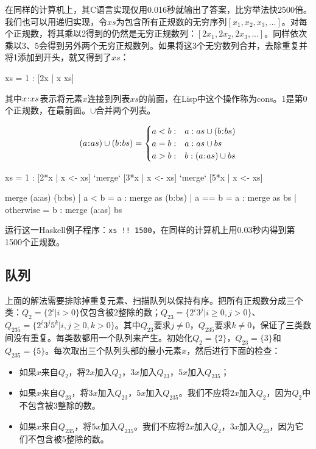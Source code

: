 \documentclass[b5paper, punct=kaiming]{ctexart}
\begin{document}
在同样的计算机上，其C语言实现仅用0.016秒就输出了答案，比穷举法快2500倍。我们也可以用递归实现，令$xs$为包含所有正规数的无穷序列$[x_1, x_2, x_3, ...]$。对每个正规数，将其乘以2得到的仍然是无穷正规数列：$[2x_1, 2x_2, 2x_3, ...]$。同样依次乘以3、5会得到另外两个无穷正规数列。如果将这3个无穷数列合并，去除重复并将1添加到开头，就又得到了$xs$：

\be
  xs = 1 : [2x | x \gets xs] \cup [3x | x \gets xs] \cup [5x | x \gets xs]
\ee

其中$x \mathbin{\!:\!} xs$表示将元素$x$连接到列表$xs$的前面，在Lisp中这个操作称为cons。1是第0个正规数，在最前面。$\cup$合并两个列表。

\[
(a \cons as) \cup (b \cons bs) = \begin{cases}
  a < b: & a : as \cup (b \cons bs) \\
  a = b: & a : as \cup bs \\
  a > b: & b : (a \cons as) \cup bs \\
\end{cases}
\]

\begin{Haskell}
xs = 1 : [2*x | x <- xs] `merge` [3*x | x <- xs] `merge` [5*x | x <- xs]

merge (a:as) (b:bs) | a < b = a : merge as (b:bs)
                    | a == b = a : merge as bs
                    | otherwise = b : merge (a:as) bs
\end{Haskell}

运行这一Haskell例子程序：\texttt{xs !! 1500}，在同样的计算机上用0.03秒内得到第1500个正规数。

\subsection*{队列}
上面的解法需要排除掉重复元素、扫描队列以保持有序。把所有正规数分成三个类：$Q_2 = \{2^i | i > 0\}$仅包含被2整除的数；$Q_{23} = \{ 2^i3^j | i \geq 0, j > 0 \}$、$Q_{235} = \{ 2^i3^j5^k | i,j \geq 0, k > 0\}$。其中$Q_{23}$要求$j \neq 0$，$Q_{235}$要求$k \neq 0$，保证了三类数间没有重复。每类数都用一个队列来产生。初始化$Q_2=\{ 2 \}$，$Q_{23} = \{ 3 \}$和$Q_{235} = \{ 5 \}$。每次取出三个队列头部的最小元素$x$，然后进行下面的检查：

\begin{itemize}
\item 如果$x$来自$Q_2$，将$2x$加入$Q_2$，$3x$加入$Q_{23}$，$5x$加入$Q_{235}$；
\item 如果$x$来自$Q_{23}$，将$3x$加入$Q_{23}$，$5x$加入$Q_{235}$。我们不应将$2x$加入$Q_2$，因为$Q_2$中不包含被3整除的数。
\item 如果$x$来自$Q_{235}$，将$5x$加入$Q_{235}$。我们不应将$2x$加入$Q_2$，$3x$加入$Q_{23}$，因为它们不包含被5整除的数。
\end{itemize}
\end{document}

